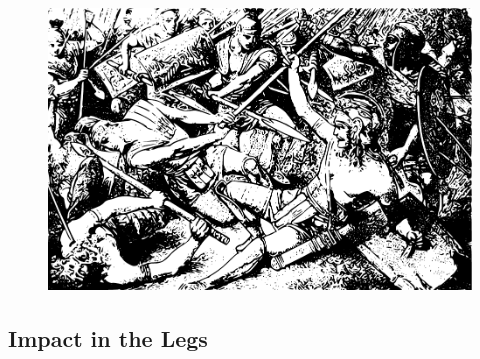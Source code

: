 \documentclass[12pt]{book}  %
\begin{document}
\begin{figure}[h]
    \centering
    \includegraphics[width=\textwidth]{./images/combat13.pdf}
\end{figure}

\subsection{Impact in the Legs}
\end{document}
